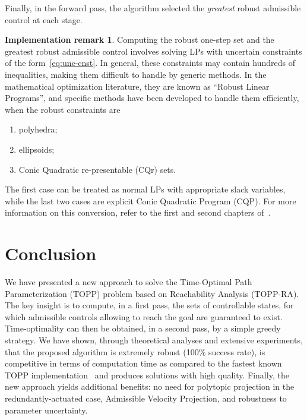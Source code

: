 \documentclass[journal]{IEEEtran}
\theoremstyle{plain}
\theoremstyle{definition}
\theoremstyle{definition}
\newtheorem{remark2}{Implementation remark}
\newenvironment{remark}
  {\renewcommand{\qedsymbol}{$\lozenge$}%
   \pushQED{\qed}\begin{remark2}}
  {\popQED\end{remark2}}
\begin{document}
Finally, in the forward pass, the algorithm selected the
\emph{greatest} robust admissible control at each stage.

\begin{remark}
  Computing the robust one-step set and the greatest robust admissible
  control involves solving LPs with uncertain constraints of the
  form~\eqref{eq:unc-cnst}. In general, these constraints may contain
  hundreds of inequalities, making them difficult to handle by generic
  methods. In the mathematical optimization literature, they are known
  as ``Robust Linear Programs'', and specific methods have been
  developed to handle them efficiently, when the robust constraints
  are~\cite{ben2001lectures}
  \begin{enumerate}
  \item polyhedra;
  \item ellipsoids;
  \item Conic Quadratic re-presentable (CQr) sets.
  \end{enumerate}
  The first case can be treated as normal LPs with appropriate slack
  variables, while the last two cases are explicit Conic Quadratic
  Program (CQP). For more information on this conversion, refer to the
  first and second chapters of~\cite{ben2001lectures}.
\end{remark}


\section{Conclusion}
\label{sec:discussion}

We have presented a new approach to solve the Time-Optimal Path
Parameterization (TOPP) problem based on Reachability Analysis
(TOPP-RA). The key insight is to compute, in a first pass, the sets of
controllable states, for which admissible controls allowing to reach
the goal are guaranteed to exist. Time-optimality can then be
obtained, in a second pass, by a simple greedy strategy. We have
shown, through theoretical analyses and extensive experiments, that
the proposed algorithm is extremely robust (100\% success rate), is
competitive in terms of computation time as compared to the fastest
known TOPP implementation~\cite{pham2014general} and produces
solutions with high quality. Finally, the new approach yields
additional benefits: no need for polytopic projection in the
redundantly-actuated case, Admissible Velocity Projection, and
robustness to parameter uncertainty.
\end{document}
